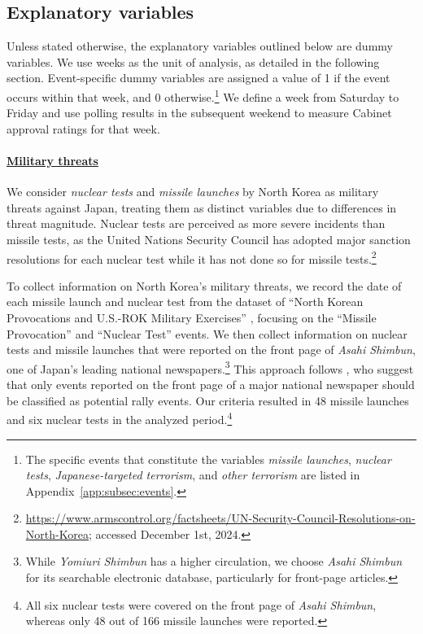 \documentclass[letterpaper,12pt]{scrartcl}
\begin{document}
\subsection*{Explanatory variables}

Unless stated otherwise, the explanatory variables outlined below are dummy variables. We use weeks as the unit of analysis, as detailed in the following section. Event-specific dummy variables are assigned a value of 1 if the event occurs within that week, and 0 otherwise.\footnote{The specific events that constitute the variables \emph{missile launches}, \emph{nuclear tests}, \emph{Japanese-targeted terrorism}, and \emph{other terrorism} are listed in Appendix~\ref{app:subsec:events}.}
We define a week from Saturday to Friday and use polling results in the subsequent weekend to measure Cabinet approval ratings for that week.

\bigskip
\noindent \paragraph{\uline{Military threats}}
We consider \emph{nuclear tests} and \emph{missile launches} by North Korea as military threats against Japan, treating them as distinct variables due to differences in threat magnitude. Nuclear tests are perceived as more severe incidents than missile tests, as the United Nations Security Council has adopted major sanction resolutions for each nuclear test while it has not done so for missile tests.\footnote{\url{https://www.armscontrol.org/factsheets/UN-Security-Council-Resolutions-on-North-Korea}; accessed December 1st, 2024.}

To collect information on North Korea's military threats, we record the date of each missile launch and nuclear test from the dataset of ``North Korean Provocations and U.S.-ROK Military Exercises'' \citep{CSIS2023}, focusing on the ``Missile Provocation'' and ``Nuclear Test'' events. We then collect information on nuclear tests and missile launches that were reported on the front page of \emph{Asahi Shimbun}, one of Japan's leading national newspapers.\footnote{While \emph{Yomiuri Shimbun} has a higher circulation, we choose \emph{Asahi Shimbun} for its searchable electronic database, particularly for front-page articles.} This approach follows \citet{Newman2010ElectStud}, who suggest that only events reported on the front page of a major national newspaper should be classified as potential rally events. Our criteria resulted in 48 missile launches and six nuclear tests in the analyzed period.\footnote{All six nuclear tests were covered on the front page of \emph{Asahi Shimbun}, whereas only 48 out of 166 missile launches were reported.}
\end{document}
